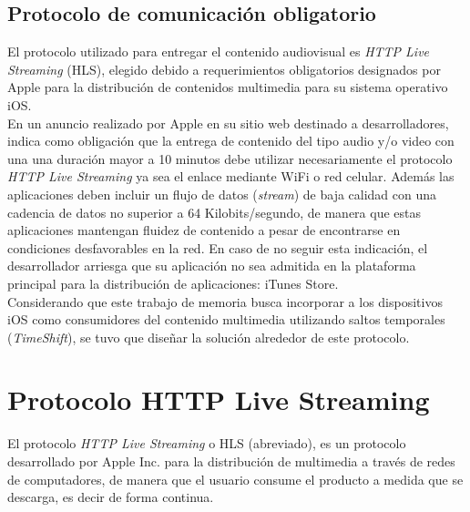 \subsection{Protocolo de comunicación obligatorio}
	El protocolo utilizado para entregar el contenido audiovisual es \textit{HTTP Live Streaming} (HLS), elegido debido a requerimientos obligatorios designados por Apple para la distribución de contenidos multimedia para su sistema operativo iOS.\\
	
	En un anuncio realizado por Apple en su sitio web destinado a desarrolladores, indica como obligación que la entrega de contenido del tipo audio y/o video con una una duración mayor a 10 minutos debe utilizar necesariamente el protocolo \textit{HTTP Live Streaming} ya sea el enlace mediante WiFi o red celular. Además las aplicaciones deben incluir un flujo de datos (\textit{stream}) de baja calidad con una cadencia de datos no superior a 64 Kilobits/segundo, de manera que estas aplicaciones mantengan fluidez de contenido a pesar de encontrarse en condiciones desfavorables en la red. En caso de no seguir esta indicación, el desarrollador arriesga que su aplicación no sea admitida en la plataforma principal para la distribución de aplicaciones: iTunes Store.\\

	Considerando que este trabajo de memoria busca incorporar a los dispositivos iOS como consumidores del contenido multimedia utilizando saltos temporales (\textit{TimeShift}), se tuvo que diseñar la solución alrededor de este protocolo.


\section{Protocolo HTTP Live Streaming}

El protocolo \textit{HTTP Live Streaming} o HLS (abreviado), es un protocolo desarrollado por Apple Inc. para la distribución de multimedia a través de redes de computadores, de manera que el usuario consume el producto a medida que se descarga, es decir de forma continua.\\

